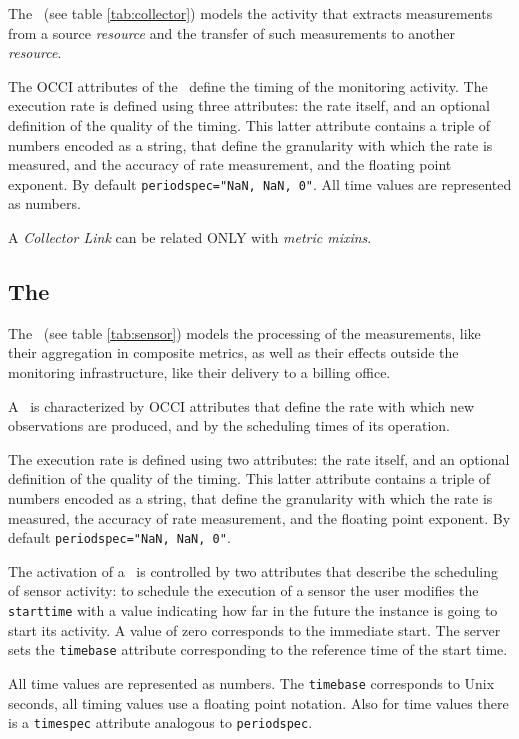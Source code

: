 \documentclass[12pt]{article}  %
\begin{document}


The \coll\ (see table \ref{tab:collector}) models the activity that extracts measurements from a source {\em resource} and the transfer of such measurements to another {\em resource}.

The OCCI attributes of the \coll\ define the timing of the monitoring activity.
The execution rate is defined using three attributes: the rate itself, and an optional definition of the quality of the timing. This latter attribute contains a triple of numbers encoded as a string, that define the granularity with which the rate is measured, and the accuracy of rate measurement, and the floating point exponent. By default \verb|periodspec="NaN, NaN, 0"|. All time values are represented as numbers.

A {\em Collector Link} can be related ONLY with {\em metric mixins}.

\subsection{The \sens \label{sec:sensor}}



The \sens\ (see table \ref{tab:sensor}) models the processing of the measurements, like their aggregation in composite metrics, as well as their effects outside the monitoring infrastructure, like their delivery to a billing office.

A \sens\ is characterized by OCCI attributes that define the rate with which new observations are produced, and by the scheduling times of its operation.

The execution rate is defined using two attributes: the rate itself, and an optional definition of the quality of the timing. This latter attribute contains a triple of numbers encoded as a string, that define the granularity with which the rate is measured, the accuracy of rate measurement, and the floating point exponent. By default \verb|periodspec="NaN, NaN, 0"|.

The activation of a \sens\ is controlled by two attributes that describe the scheduling of sensor activity: to schedule the execution of a sensor the user modifies the {\tt starttime} with a value indicating how far in the future the instance is going to start its activity. A value of zero corresponds to the immediate start. The server sets the {\tt timebase} attribute corresponding to the reference time of the start time.

All time values are represented as numbers. The {\tt timebase} corresponds to Unix seconds, all timing values use a floating point notation. Also for time values there is a {\tt timespec} attribute analogous to {\tt periodspec}.
\end{document}

